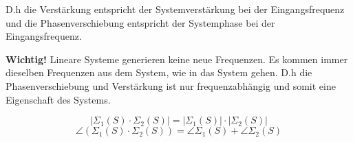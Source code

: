         D.h die Verstärkung entspricht der Systemverstärkung bei der Eingangsfrequenz und die Phasenverschiebung entspricht der Systemphase bei der Eingangsfrequenz. 
        
        \textbf{Wichtig!} Lineare Systeme generieren keine neue Frequenzen. Es kommen immer dieselben Frequenzen aus dem System, wie in das System gehen. D.h die Phasenverschiebung und Verstärkung ist nur frequenzabhängig und somit eine Eigenschaft des Systems.
        
        \[\left|\Sigma_1(S)\cdot\Sigma_2(S)\right| = \left|\Sigma_1(S)\right|\cdot\left|\Sigma_2(S)\right|\]
        \[\angle(\Sigma_1(S)\cdot\Sigma_2(S)) = \angle\Sigma_1(S)+\angle\Sigma_2(S)\]
        